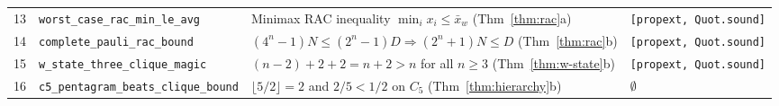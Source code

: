 \documentclass[11pt,a4paper]{article}
\theoremstyle{definition}
\theoremstyle{remark}
\newcommand{\Code}[1]{{\small\texttt{#1}}}
\begin{document}
\begin{table}[t]
{\begin{tabular}{@{}clll@{}}
13 & \Code{worst\_case\_rac\_min\_le\_avg} & Minimax RAC inequality $\min_i x_i \le \bar{x}_w$ (Thm~\ref{thm:rac}a) & \Code{[propext, Quot.sound]} \\
14 & \Code{complete\_pauli\_rac\_bound} & $(4^n-1)N \le (2^n-1)D \Rightarrow (2^n+1)N \le D$ (Thm~\ref{thm:rac}b) & \Code{[propext, Quot.sound]} \\
15 & \Code{w\_state\_three\_clique\_magic} & $(n-2) + 2 + 2 = n + 2 > n$ for all $n \ge 3$ (Thm~\ref{thm:w-state}b) & \Code{[propext, Quot.sound]} \\
16 & \Code{c5\_pentagram\_beats\_clique\_bound} & $\lfloor 5/2 \rfloor = 2$ and $2/5 < 1/2$ on $C_5$ (Thm~\ref{thm:hierarchy}b) & $\emptyset$ \\
\bottomrule
\end{tabular}}
\end{table}
\end{document}
